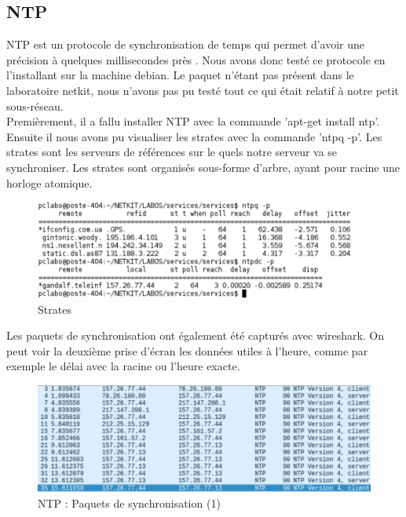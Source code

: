 \documentclass{article}
\begin{document}
\subsection{NTP}

NTP est un protocole de synchronisation de temps qui permet d'avoir une précision à quelques millisecondes près \cite{NTP}. Nous avons donc testé ce protocole en l'installant sur la machine debian. Le paquet n'étant pas présent dans le laboratoire netkit, nous n'avons pas pu testé tout ce qui était relatif à notre petit sous-réseau.\\

Premièrement, il a fallu installer NTP avec la commande 'apt-get install ntp'.\\

Ensuite il nous avons pu visualiser les strates avec la commande 'ntpq -p'. Les strates sont les serveurs de références sur le quels notre serveur va se synchroniser. Les strates sont organisés sous-forme d'arbre, ayant pour racine une horloge atomique.

\begin{figure}[h]
	\centering
	\includegraphics{./captures/ntp.png}
	\caption{Strates}
	\label{fig:Strates}
\end{figure}

\clearpage

Les paquets de synchronisation ont également été capturés avec wireshark. On peut voir la deuxième prise d'écran les données utiles à l'heure, comme par exemple le délai avec la racine ou l'heure exacte.

\begin{figure}[h]
	\centering
	\includegraphics{./captures/ntp-capture.png}
	\caption{NTP : Paquets de synchronisation (1)}
	\label{fig:NTP : Paquets de synchronisation (1)}
\end{figure}
\end{document}
